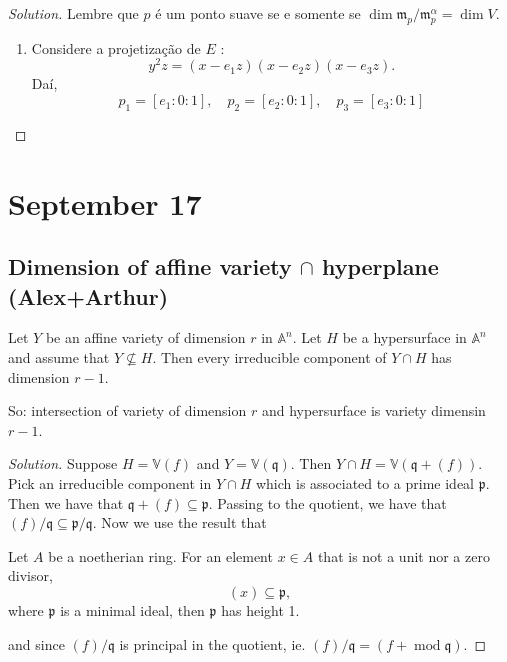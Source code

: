 \begin{proof}[Solution] Lembre que $p$ \'e um ponto suave se e somente se $\dim \mathfrak{m}_p/\mathfrak{m}_p^\alpha=\dim V$.
	\begin{enumerate}[label=\textbf{Step \arabic*}]
		\item Considere a projetiza\c c\~ao de $E$ :
			\[y^2z=(x-e_1z)(x-e_2z)(x-e_3z).\]
			Da\'i,
			\[p_1=[e_1:0:1],\quad p_2=[e_2:0:1],\quad p_3=[e_3:0:1]\]
			
	\end{enumerate}
\end{proof}

\section{September 17}
\subsection{Dimension of affine variety $\cap$ hyperplane (Alex+Arthur)}

\begin{manualexercise}{1.8}
	Let $Y$ be an affine variety of dimension $r$ in $\mathbb{A}^n$. Let $H$ be a hypersurface in $\mathbb{A}^n$ and assume that $ Y\not\subseteq H$. Then every irreducible component of $Y\cap H$ has dimension $r-1$.

	So: intersection of variety of dimension $r$ and hypersurface is variety dimensin $r-1$.
\end{manualexercise}

\begin{proof}[Solution]\leavevmode
	Suppose $H=\mathbb{V}(f)$ and $Y=\mathbb{V}(\mathfrak{q})$. Then $Y\cap H=\mathbb{V}(\mathfrak{q}+(f))$. Pick an irreducible component in $Y\cap H$ which is associated to a prime ideal $\mathfrak{p}$. Then we have that $\mathfrak{q}+(f)\subseteq \mathfrak{p}$. Passing to the quotient, we have that $(f)/\mathfrak{q}\subseteq \mathfrak{p}/\mathfrak{q}$. Now we use the result that

	\begin{thm}
		Let $A$ be a noetherian ring. For an element $x\in A$ that is not a unit nor a zero divisor,
		\[(x)\subseteq \mathfrak{p},\]
		where $\mathfrak{p}$ is a minimal ideal, then $\mathfrak{p}$ has height 1.
	\end{thm}
and since $(f)/\mathfrak{q}$ is principal in the quotient, ie. $(f)/\mathfrak{q}=(f+\operatorname{mod}\mathfrak{q})$.
\end{proof}


